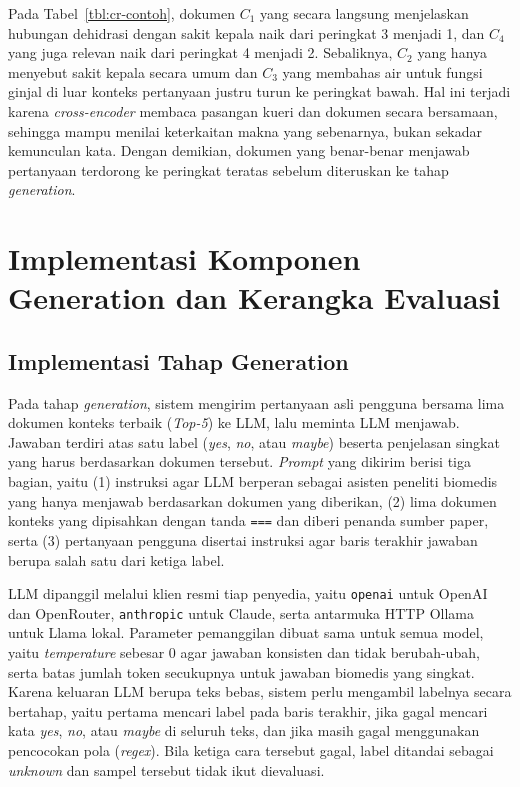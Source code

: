 Pada Tabel~\ref{tbl:cr-contoh}, dokumen $C_1$ yang secara langsung menjelaskan hubungan dehidrasi dengan sakit kepala naik dari peringkat 3 menjadi 1, dan $C_4$ yang juga relevan naik dari peringkat 4 menjadi 2. Sebaliknya, $C_2$ yang hanya menyebut sakit kepala secara umum dan $C_3$ yang membahas air untuk fungsi ginjal di luar konteks pertanyaan justru turun ke peringkat bawah. Hal ini terjadi karena \textit{cross-encoder} membaca pasangan kueri dan dokumen secara bersamaan, sehingga mampu menilai keterkaitan makna yang sebenarnya, bukan sekadar kemunculan kata. Dengan demikian, dokumen yang benar-benar menjawab pertanyaan terdorong ke peringkat teratas sebelum diteruskan ke tahap \textit{generation}.


\section{Implementasi Komponen Generation dan Kerangka Evaluasi}
\label{sec:impl-generation-evaluasi}

\subsection{Implementasi Tahap Generation}
\label{subsec:impl-generation}

Pada tahap \textit{generation}, sistem mengirim pertanyaan asli pengguna bersama lima dokumen konteks terbaik (\textit{Top-5}) ke LLM, lalu meminta LLM menjawab. Jawaban terdiri atas satu label (\textit{yes}, \textit{no}, atau \textit{maybe}) beserta penjelasan singkat yang harus berdasarkan dokumen tersebut. \textit{Prompt} yang dikirim berisi tiga bagian, yaitu (1) instruksi agar LLM berperan sebagai asisten peneliti biomedis yang hanya menjawab berdasarkan dokumen yang diberikan, (2) lima dokumen konteks yang dipisahkan dengan tanda \texttt{===} dan diberi penanda sumber paper, serta (3) pertanyaan pengguna disertai instruksi agar baris terakhir jawaban berupa salah satu dari ketiga label.

LLM dipanggil melalui klien resmi tiap penyedia, yaitu \texttt{openai} untuk OpenAI dan OpenRouter, \texttt{anthropic} untuk Claude, serta antarmuka HTTP Ollama untuk Llama lokal. Parameter pemanggilan dibuat sama untuk semua model, yaitu \textit{temperature} sebesar 0 agar jawaban konsisten dan tidak berubah-ubah, serta batas jumlah token secukupnya untuk jawaban biomedis yang singkat. Karena keluaran LLM berupa teks bebas, sistem perlu mengambil labelnya secara bertahap, yaitu pertama mencari label pada baris terakhir, jika gagal mencari kata \textit{yes}, \textit{no}, atau \textit{maybe} di seluruh teks, dan jika masih gagal menggunakan pencocokan pola (\textit{regex}). Bila ketiga cara tersebut gagal, label ditandai sebagai \textit{unknown} dan sampel tersebut tidak ikut dievaluasi.

